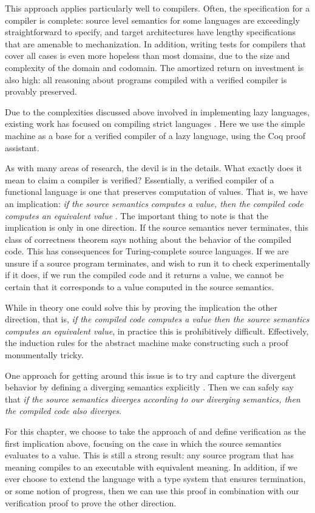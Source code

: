 This approach applies particularly well to compilers. Often, the specification
for a compiler is complete: source level semantics for some languages are
exceedingly straightforward to specify, and target architectures have lengthy
specifications that are amenable to mechanization. In addition, writing tests
for compilers that cover all cases is even more hopeless than most domains, due
to the size and complexity of the domain and codomain. The amortized return on
investment is also high: all reasoning about programs compiled with a verified
compiler is provably preserved. 

Due to the complexities discussed above involved in implementing lazy languages,
existing work has focused on compiling strict languages
\cite{chlipala2007certified, leroy2012compcert, cakeml14}. Here we use the
simple \ce machine as a base for a verified compiler of a lazy language, using
the Coq proof assistant. 

As with many areas of research, the devil is in the details. What exactly does
it mean to claim a compiler is verified?  Essentially, a verified compiler of a
functional language is one that preserves computation of values. That is, we
have an implication: \emph{if the source semantics computes a
value, then the compiled code computes an equivalent value}
\cite{chlipala2007certified}. The important thing to note is that the
implication is only in one direction. If the source semantics never terminates,
this class of correctness theorem says nothing about the behavior of the
compiled code. This has consequences for Turing-complete source languages. If we
are unsure if a source program terminates, and wish to run it to check
experimentally if it does, if we run the compiled code and it returns a value,
we cannot be certain that it corresponds to a value computed in the source
semantics. 

While in theory one could solve this by proving the implication the other
direction, that is, \emph{if the compiled code computes a value then the source
semantics computes an equivalent value}, in practice this is prohibitively
difficult. Effectively, the induction rules for the abstract machine make
constructing such a proof monumentally tricky. 

One approach for getting around this issue is to try and capture the divergent
behavior by defining a diverging semantics explicitly \cite{functionalbigstep}.
Then we can safely say that \emph{if the source semantics diverges according to
our diverging semantics, then the compiled code also diverges}. 

For this chapter, we choose to take the approach of \cite{chlipala2007certified}
and define verification as the first implication above, focusing on the case in
which the source semantics evaluates to a value. This is still a strong
result: any source program that has meaning compiles to an executable with
equivalent meaning. In addition, if we ever choose to extend the language with a
type system that ensures termination, or some notion of progress, then we can
use this proof in combination with our verification proof to prove the other
direction. 
